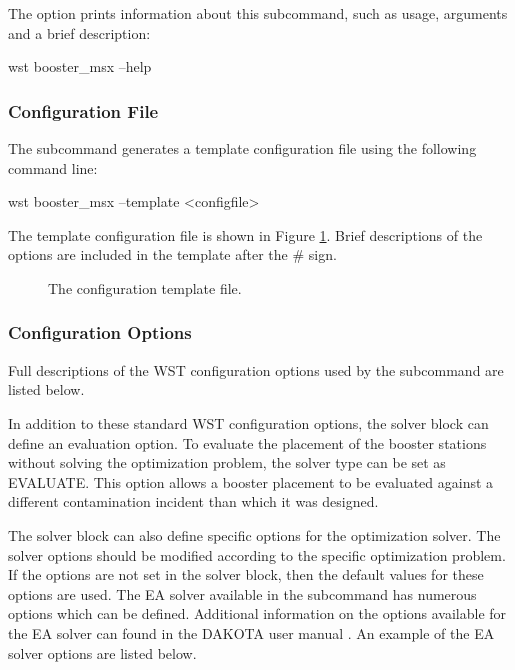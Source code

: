The  option prints information about this subcommand, such as usage,
arguments and a brief description:
\begin{unknownListing}
wst booster_msx --help
\end{unknownListing}

\subsubsection{Configuration File}

The  subcommand generates a template configuration file using the following command line:

\begin{unknownListing}
wst booster_msx --template <configfile>
\end{unknownListing}

The  template configuration file is shown in Figure \ref{fig:booster_msx_template}.  
Brief descriptions of the options are included in the template after the \# sign.  

\begin{figure}[p!]
  \caption{The  configuration template file.}
  \label{fig:booster_msx_template}
\end{figure}

\subsubsection{Configuration Options}

Full descriptions of the WST configuration options used by the  subcommand are listed below.


In addition to these standard WST configuration options, the solver block can define 
an evaluation option. To evaluate the placement 
of the booster stations without solving the optimization problem, the solver type can 
be set as EVALUATE. This option allows a booster placement to be evaluated against a 
different contamination incident than which it was designed. 

The solver block can also define specific options for the optimization solver. 
The solver options should be modified according to the specific optimization problem. 
If the options are not set in the solver block, then the default values for these options are used. 
The EA solver available in the  subcommand has numerous options 
which can be defined. Additional information on the options available for the EA solver can 
found in the DAKOTA user manual \citep{DakotaUserManual}. An example of the EA solver 
options are listed below.

